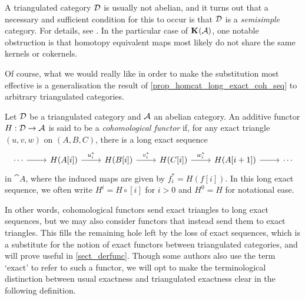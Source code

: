 \begin{remark}
  A triangulated category $\mathcal{D}$ is usually not abelian, and
  it turns out that a necessary and sufficient condition for this to
  occur is that $\mathcal{D}$ is a \emph{semisimple} category.
  For details, see
  \cite[Section~III.2.3~and~Exercise~IV.1.1]{gelfand_and_manin}.
  In the particular case of ${\mathbf{K}}^{{}}({\mathcal{A}})$, one notable
  obstruction is that homotopy equivalent maps most likely do not
  share the same kernels or cokernels.
\end{remark}

Of course, what we would really like in order to make the
substitution most effective is a generalisation the result of
\cref{prop_homcat_long_exact_coh_seq} to arbitrary triangulated categories.

\begin{definition}
  Let $\mathcal{D}$ be a triangulated category and $\mathcal{A}$ an
  abelian category.
  An additive functor $H: \mathcal{D} \to \mathcal{A}$ is said to be
  a \emph{cohomological functor} if, for any exact triangle $(u, v,
  w)$ on $(A, B, C)$, there is a long exact sequence
  \[
    \begin{tikzcd}
      \cdots \arrow[r]
      & H(A[i]) \arrow[r, "u_i^*"]
      & H(B[i]) \arrow[r, "v_i^*"]
      & H(C[i]) \arrow[r, "w_i^*"]
      & H(A[i + 1]) \arrow[r]
      & \cdots
    \end{tikzcd}
  \]
  in $\cat{A}$, where the induced maps are given by $f_i^* = H(f[i])$.
  In this long exact sequence, we often write $H^i = H \circ [i]$ for
  $i > 0$ and $H^0 = H$ for notational ease.
\end{definition}


In other words, cohomological functors send exact triangles to long
exact sequences, but we may also consider functors that instead send
them to exact triangles.
This fills the remaining hole left by the loss of exact sequences,
which is a substitute for the notion of exact functors between
triangulated categories, and will prove useful in \cref{sect_derfunc}.
Though some authors also use the term `exact' to refer to such a
functor, we will opt to make the terminological distinction between
usual exactness and triangulated exactness clear in the following definition.

